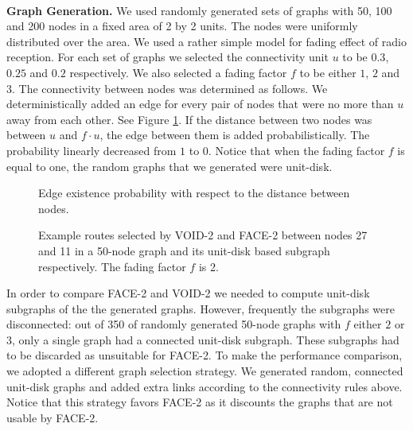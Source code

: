 \documentclass[conference]{IEEEtran}
\begin{document}
\ \\ \textbf{Graph Generation.}  We used randomly generated sets of
graphs with 50, 100 and 200 nodes in a fixed area of 2 by 2 units. The
nodes were uniformly distributed over the area. We used a rather
simple model for fading effect of radio reception.  For each set of
graphs we selected the connectivity unit $u$ to be $0.3$, $0.25$ and
$0.2$ respectively. We also selected a fading factor $f$ to be either
$1$, $2$ and $3$.  The connectivity between nodes was determined as
follows. We deterministically added an edge for every pair of nodes
that were no more than $u$ away from each other.  See Figure
\ref{figProbability}.  If the distance between two nodes was between
$u$ and $f\cdot u$, the edge between them is added
probabilistically. The probability linearly decreased from $1$ to
$0$. Notice that when the fading factor $f$ is equal to one, the
random graphs that we generated were unit-disk.


\begin{figure} 
\center 
{}
\caption{Edge existence probability with respect to the distance
         between nodes.}
\label{figProbability}
\end{figure}


\begin{figure*}[ht]
\begin{minipage}[b]{.47\linewidth}
\end{minipage}\hfill
\begin{minipage}[b]{.47\linewidth}
\end{minipage}
\caption{Example routes selected by VOID-2 and FACE-2 between nodes 27
and 11 in a 50-node graph and its unit-disk based subgraph respectively.
The fading factor $f$ is 2.}
\label{figRoutes}
\end{figure*}


In order to compare FACE-2 and VOID-2 we needed to compute unit-disk
subgraphs of the the generated graphs. However, frequently the
subgraphs were disconnected: out of 350 of randomly generated 50-node
graphs with $f$ either $2$ or $3$, only a single graph had a connected
unit-disk subgraph. These subgraphs had to be discarded as unsuitable
for FACE-2. To make the performance comparison, we adopted a different
graph selection strategy. We generated random, connected unit-disk
graphs and added extra links according to the connectivity rules
above. Notice that this strategy favors FACE-2 as it discounts the
graphs that are not usable by FACE-2.
\end{document}
